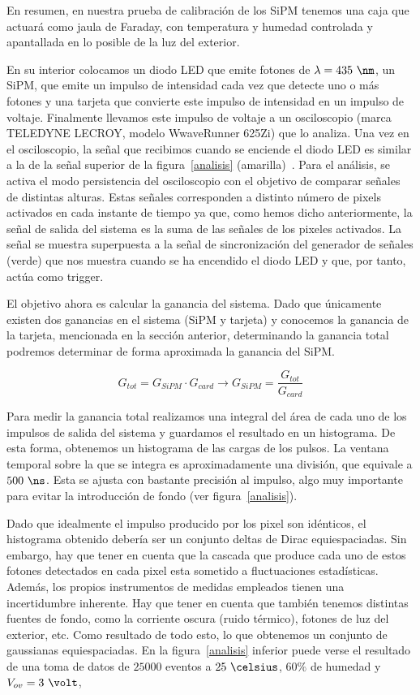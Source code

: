  En resumen, en nuestra prueba de calibración de los SiPM tenemos una caja que actuará como jaula de Faraday, con temperatura y humedad controlada y apantallada en lo posible de la luz del exterior. 

En su interior colocamos un diodo LED que emite fotones de $\lambda=435~\nm$, un SiPM, que emite un impulso de intensidad cada vez que detecte uno o más  fotones  y una tarjeta que convierte este impulso de intensidad en un impulso de voltaje. Finalmente llevamos este impulso de voltaje a un osciloscopio (marca TELEDYNE LECROY, modelo WwaveRunner 625Zi) que lo analiza. 
Una vez en el osciloscopio, la señal que recibimos cuando se enciende el diodo LED es similar a la de la señal superior de la figura~\ref{analisis} (amarilla)~\cite{inftec}. Para el análisis,  se  activa el modo persistencia del osciloscopio con el objetivo de comparar señales de distintas alturas. Estas señales corresponden a distinto número de pixels activados en cada instante de tiempo ya que, como hemos dicho anteriormente, la señal de salida del sistema es la suma de las señales de los pixeles activados. La señal se muestra superpuesta a la señal de sincronización del generador de señales (verde) que nos muestra cuando se ha encendido el diodo LED y que, por tanto, actúa como trigger.

El objetivo ahora es calcular la ganancia del sistema. Dado que únicamente existen dos ganancias en el sistema (SiPM y tarjeta) y conocemos la ganancia de la tarjeta, mencionada en la sección anterior, determinando la ganancia total podremos determinar de forma aproximada la ganancia del SiPM. 

\begin{equation}
G_{tot}=G_{SiPM} \cdotp G_{card} \longrightarrow G_{SiPM} = \frac{G_{tot}}{G_{card}}
\label{ganancias}
\end{equation}

Para medir la ganancia total realizamos una integral del área de cada uno de los impulsos de salida del sistema y guardamos el resultado en un histograma. De esta forma, obtenemos un histograma de las cargas de los pulsos. La ventana temporal sobre la que se integra es aproximadamente una división, que equivale a $500~\ns$. Esta se ajusta con bastante precisión al impulso, algo muy importante para evitar la introducción de fondo (ver figura~\ref{analisis}).

Dado que idealmente el impulso producido por  los pixel son idénticos, el histograma obtenido debería ser  un conjunto deltas de Dirac equiespaciadas. Sin embargo, hay que tener en cuenta que la cascada que produce cada uno de estos fotones detectados en cada pixel esta sometido a fluctuaciones estadísticas. Además, los propios instrumentos de medidas empleados tienen una incertidumbre inherente. Hay que tener en cuenta que también tenemos distintas fuentes de fondo, como la corriente oscura (ruido térmico), fotones de luz del exterior, etc. 
Como resultado de todo esto, lo que obtenemos un conjunto de gaussianas equiespaciadas. En la figura~\ref{analisis} inferior puede verse el resultado de una toma de datos de $25000$ eventos a $25~\celsius$, $60\%$ de humedad y $V_{ov}=3~\volt$,

